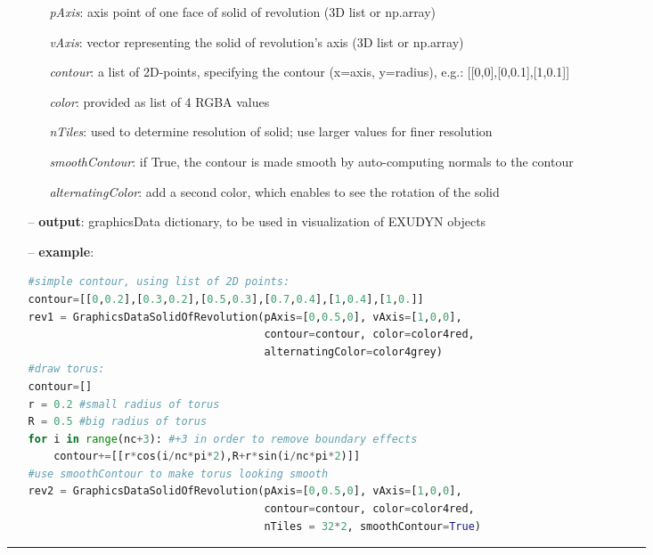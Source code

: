 \begin{itemize}[leftmargin=1.4cm]
\begin{itemize}[leftmargin=0.5cm]
\begin{itemize}[leftmargin=1.4cm]
\begin{itemize}[leftmargin=0.5cm]
\begin{itemize}[leftmargin=1.4cm]
\begin{itemize}[leftmargin=0.5cm]
\begin{itemize}[leftmargin=0.7cm]
  \begin{itemize}[leftmargin=1.2cm]
\setlength{\itemindent}{-0.7cm}
    \item[] {\it pAxis}: axis point of one face of solid of revolution (3D list or np.array)
    \item[] {\it    vAxis}: vector representing the solid of revolution's axis (3D list or np.array)
    \item[] {\it    contour}: a list of 2D-points, specifying the contour (x=axis, y=radius), e.g.: [[0,0],[0,0.1],[1,0.1]]
    \item[] {\it    color}: provided as list of 4 RGBA values
    \item[] {\it    nTiles}: used to determine resolution of solid; use larger values for finer resolution
    \item[] {\it    smoothContour}: if True, the contour is made smooth by auto-computing normals to the contour
    \item[] {\it    alternatingColor}: add a second color, which enables to see the rotation of the solid
  \end{itemize}
  \item[--]  {\bf output}: graphicsData dictionary, to be used in visualization of EXUDYN objects  \item[--]  {\bf example}: \vspace{-12pt}\ei\begin{lstlisting}[language=Python, xleftmargin=36pt]
#simple contour, using list of 2D points:
contour=[[0,0.2],[0.3,0.2],[0.5,0.3],[0.7,0.4],[1,0.4],[1,0.]]
rev1 = GraphicsDataSolidOfRevolution(pAxis=[0,0.5,0], vAxis=[1,0,0],
                                     contour=contour, color=color4red,
                                     alternatingColor=color4grey)
#draw torus:
contour=[]
r = 0.2 #small radius of torus
R = 0.5 #big radius of torus
for i in range(nc+3): #+3 in order to remove boundary effects
    contour+=[[r*cos(i/nc*pi*2),R+r*sin(i/nc*pi*2)]]
#use smoothContour to make torus looking smooth
rev2 = GraphicsDataSolidOfRevolution(pAxis=[0,0.5,0], vAxis=[1,0,0],
                                     contour=contour, color=color4red,
                                     nTiles = 32*2, smoothContour=True)\end{lstlisting}\vspace{-24pt}\bi\item[]\vspace{-24pt}\vspace{12pt}\end{itemize}
%
\noindent\rule{8cm}{0.75pt}\vspace{1pt} \\ 

\end{itemize}
\end{itemize}
\end{itemize}
\end{itemize}
\end{itemize}
\end{itemize}
